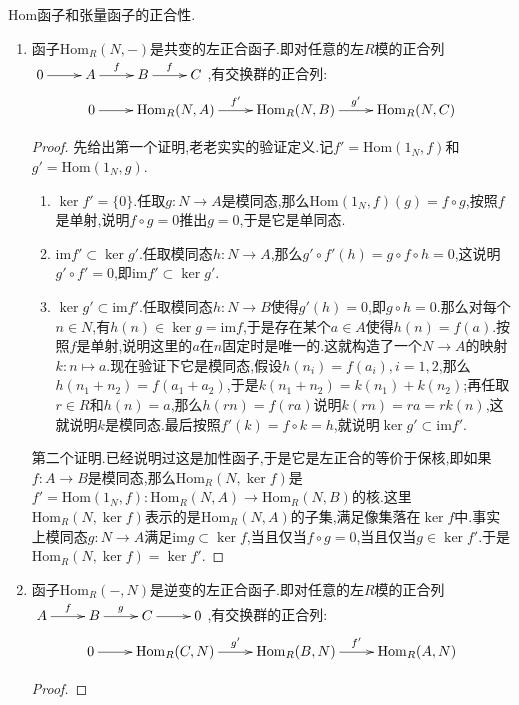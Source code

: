 Hom函子和张量函子的正合性.
\begin{enumerate}
	\item 函子$\mathrm{Hom}_R(N,-)$是共变的左正合函子.即对任意的左$R$模的正合列$\xymatrix{0\ar[r]&A\ar[r]^f&B\ar[r]^f&C}$,有交换群的正合列:
	$$\xymatrix{0\ar[r]&\mathrm{Hom}_R(N,A)\ar[r]^{f'}&\mathrm{Hom}_R(N,B)\ar[r]^{g'}&\mathrm{Hom}_R(N,C)}$$
	\begin{proof}
		
		先给出第一个证明,老老实实的验证定义.记$f'=\mathrm{Hom}(1_N,f)$和$g'=\mathrm{Hom}(1_N,g)$.
		\begin{enumerate}
			\item $\ker f'=\{0\}$.任取$g:N\to A$是模同态,那么$\mathrm{Hom}(1_N,f)(g)=f\circ g$,按照$f$是单射,说明$f\circ g=0$推出$g=0$,于是它是单同态.
			\item $\mathrm{im}f'\subset\ker g'$.任取模同态$h:N\to A$,那么$g'\circ f'(h)=g\circ f\circ h=0$,这说明$g'\circ f'=0$,即$\mathrm{im}f'\subset\ker g'$.
			\item $\ker g'\subset\mathrm{im}f'$.任取模同态$h:N\to B$使得$g'(h)=0$,即$g\circ h=0$.那么对每个$n\in N$,有$h(n)\in\ker g=\mathrm{im}f$,于是存在某个$a\in A$使得$h(n)=f(a)$.按照$f$是单射,说明这里的$a$在$n$固定时是唯一的.这就构造了一个$N\to A$的映射$k:n\mapsto a$.现在验证下它是模同态,假设$h(n_i)=f(a_i),i=1,2$,那么$h(n_1+n_2)=f(a_1+a_2)$,于是$k(n_1+n_2)=k(n_1)+k(n_2)$;再任取$r\in R$和$h(n)=a$,那么$h(rn)=f(ra)$说明$k(rn)=ra=rk(n)$,这就说明$k$是模同态.最后按照$f'(k)=f\circ k=h$,就说明$\ker g'\subset\mathrm{im}f'$.
		\end{enumerate}
		
		第二个证明.已经说明过这是加性函子,于是它是左正合的等价于保核,即如果$f:A\to B$是模同态,那么$\mathrm{Hom}_R(N,\ker f)$是$f'=\mathrm{Hom}(1_N,f):\mathrm{Hom}_R(N,A)\to\mathrm{Hom}_R(N,B)$的核.这里$\mathrm{Hom}_R(N,\ker f)$表示的是$\mathrm{Hom}_R(N,A)$的子集,满足像集落在$\ker f$中.事实上模同态$g:N\to A$满足$\mathrm{im}g\subset\ker f$,当且仅当$f\circ g=0$,当且仅当$g\in\ker f'$.于是$\mathrm{Hom}_R(N,\ker f)=\ker f'$.
	\end{proof}
	\item 函子$\mathrm{Hom}_R(-,N)$是逆变的左正合函子.即对任意的左$R$模的正合列$\xymatrix{A\ar[r]^f&B\ar[r]^g&C\ar[r]&0}$,有交换群的正合列:
	$$\xymatrix{0\ar[r]&\mathrm{Hom}_R(C,N)\ar[r]^{g'}&\mathrm{Hom}_R(B,N)\ar[r]^{f'}&\mathrm{Hom}_R(A,N)}$$
	\begin{proof}
		

\end{proof}
\end{enumerate}
